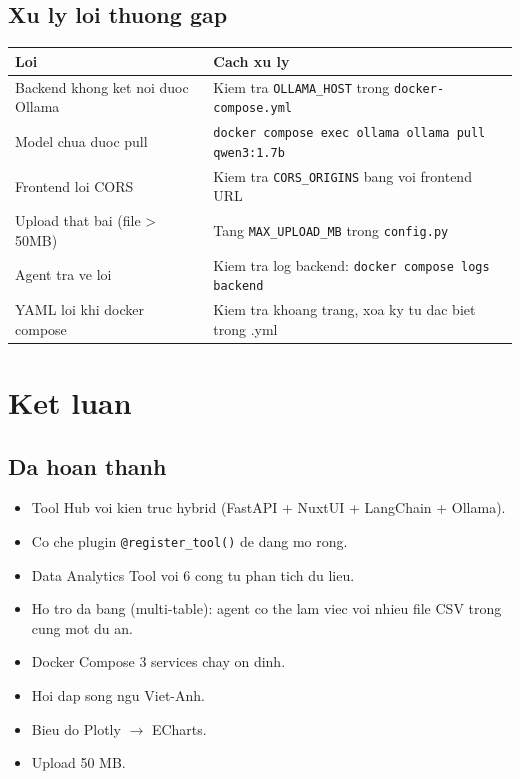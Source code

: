 \documentclass[12pt,a4paper]{article}
\begin{document}
\subsection{Xu ly loi thuong gap}

\begin{tabularx}{\textwidth}{lX}
\toprule
\bfseries Loi & \bfseries Cach xu ly \\
\midrule
Backend khong ket noi duoc Ollama
& Kiem tra \texttt{OLLAMA\_HOST} trong \texttt{docker-compose.yml} \\
Model chua duoc pull
& \texttt{docker compose exec ollama ollama pull qwen3:1.7b} \\
Frontend loi CORS
& Kiem tra \texttt{CORS\_ORIGINS} bang voi frontend URL \\
Upload that bai (file > 50MB)
& Tang \texttt{MAX\_UPLOAD\_MB} trong \texttt{config.py} \\
Agent tra ve loi
& Kiem tra log backend: \texttt{docker compose logs backend} \\
YAML loi khi docker compose
& Kiem tra khoang trang, xoa ky tu dac biet trong .yml \\
\bottomrule
\end{tabularx}

\section{Ket luan}

\subsection{Da hoan thanh}

\begin{itemize}
  \item Tool Hub voi kien truc hybrid (FastAPI + NuxtUI + LangChain + Ollama).
  \item Co che plugin \texttt{@register\_tool()} de dang mo rong.
  \item Data Analytics Tool voi 6 cong tu phan tich du lieu.
  \item Ho tro da bang (multi-table): agent co the lam viec voi nhieu file
        CSV trong cung mot du an.
  \item Docker Compose 3 services chay on dinh.
  \item Hoi dap song ngu Viet-Anh.
  \item Bieu do Plotly $\rightarrow$ ECharts.
  \item Upload 50 MB.
\end{itemize}
\end{document}
